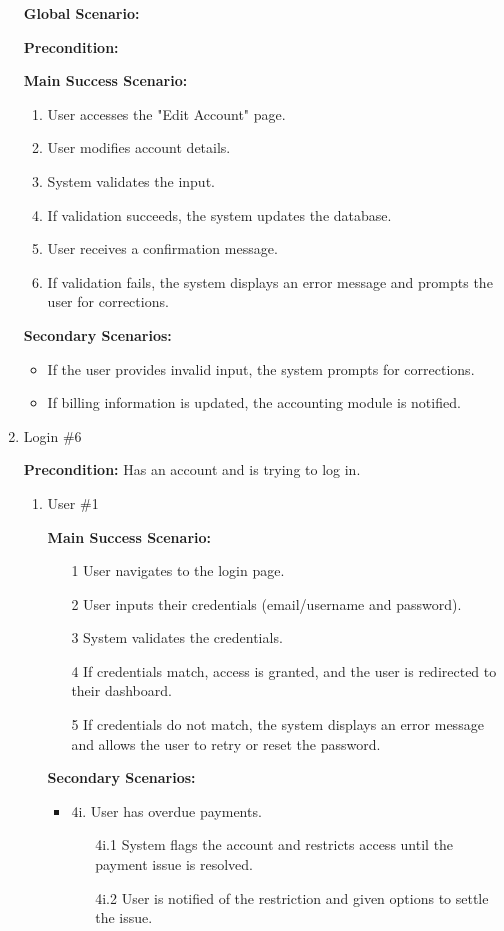 \documentclass[]{article}
\begin{document}
\begin{enumerate}[{\bf BE1.}]
\textbf{Global Scenario:}
 
\textbf{Precondition:}
 
\textbf{Main Success Scenario:}
\begin{enumerate}
\item User accesses the "Edit Account" page.
\item User modifies account details.
\item System validates the input.
\item If validation succeeds, the system updates the database.
\item User receives a confirmation message.
\item If validation fails, the system displays an error message and prompts the user for corrections.
\end{enumerate}
 
\textbf{Secondary Scenarios:}
\begin{itemize}
\item If the user provides invalid input, the system prompts for corrections.
\item If billing information is updated, the accounting module is notified.
\end{itemize}
 
 
\item Login \#6
 
\textbf{Precondition:} Has an account and is trying to log in.
 
\begin{enumerate}[{\bf VP1.}]
\item User \#1 \
 
    \textbf{Main Success Scenario:}
    \begin{enumerate}
        \item[1] User navigates to the login page.
        \item[2] User inputs their credentials (email/username and password).
        \item[3] System validates the credentials.
        \item[4] If credentials match, access is granted, and the user is redirected to their dashboard.
        \item[5] If credentials do not match, the system displays an error message and allows the user to retry or reset the password.
    \end{enumerate}
 
\textbf{Secondary Scenarios:}
\begin{itemize}
\item 4i. User has overdue payments.
\begin{enumerate}
\item[4i.1] System flags the account and restricts access until the payment issue is resolved.
\item[4i.2] User is notified of the restriction and given options to settle the issue.
\end{enumerate}
\end{itemize}
 

\end{enumerate}
\end{enumerate}
\end{document}
